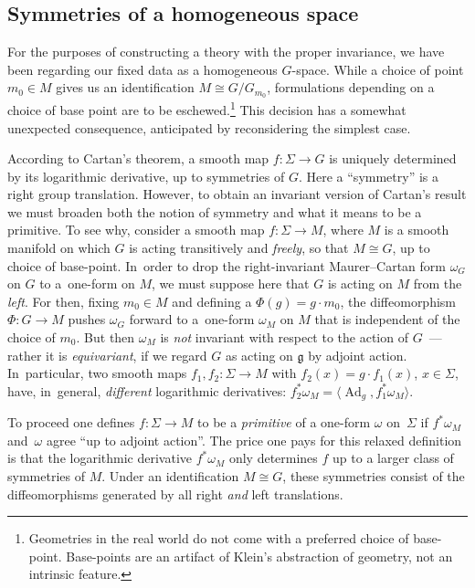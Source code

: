 \documentclass[pdftex]{sigma}%
\numberwithin{equation}{section}
\DeclareMathOperator{\Adjoint}{Ad}
\begin{document}
\subsection*{Symmetries of a homogeneous space}

For the purposes of constructing a theory with the proper invariance,
we have been regarding our fixed data as a homogeneous
$G$-space. While a choice of point $m_0 \in M$ gives us an
identification $M \cong G/G_{m_0}$, formulations depending on a choice
of base point are to be eschewed.\footnote{Geometries in the real
 world do not come with a preferred choice of base-point. Base-points
 are an artifact of Klein's abstraction of geometry, not an intrinsic
 feature.} This decision has a somewhat unexpected consequence,
anticipated by reconsidering the simplest case.

According to Cartan's theorem, a smooth map $f \colon \Sigma
\rightarrow G$ is uniquely determined by its logarithmic derivative,
up to symmetries of $G$. Here a ``symmetry'' is a right group
translation. However, to obtain an invariant version of Cartan's
result we must broaden both the notion of symmetry and what it means
to be a primitive. To see why, consider a smooth map $f \colon \Sigma
\rightarrow M$, where $ M$ is a smooth manifold on which $G$ is acting
transitively and {\em freely}, so that $M \cong G$, up to choice of
base-point. In~order to drop the right-invariant Maurer--Cartan form
$\omega_G$ on $G$ to a~one-form on $ M$, we must suppose here that $G$
is acting on $ M$ from the {\em left}. For then, fixing $ m_0 \in M$
and defining a $\Phi(g) = g \cdot m_0 $, the diffeomorphism $\Phi
\colon G \rightarrow M$ pushes $\omega_G$ forward to a~one-form
$\omega_M $ on $M$ that is independent of the choice of $ m_0$. But
then $\omega_M$ is {\em not} invariant with respect to the action of
$G$~--- rather it is {\em equivariant}, if we regard $G$ as acting on
${\mathfrak g} $ by adjoint action. In~particular, two smooth maps
$f_1, f_2 \colon \Sigma \rightarrow M$ with $f_2(x)=g \cdot f_1(x)$,
$x \in \Sigma $, have, in~general, {\em different} logarithmic
derivatives: $f_2^*\omega_M = \langle\Adjoint_g,f_1^* \omega_M\rangle
$.

To proceed one defines $f \colon \Sigma \rightarrow M$ to be a {\it primitive} of a one-form $\omega $ on~$\Sigma $ if $f^*\omega_M $ and~$\omega $ agree ``up to adjoint action''. The price one pays for this
relaxed definition is that the logarithmic derivative $f^* \omega_M $
only determines $f$ up to a larger class of symmetries of $M$. Under
an identification $M \cong G$, these symmetries consist of the
diffeomorphisms generated by all right {\em and} left translations.
\end{document}
